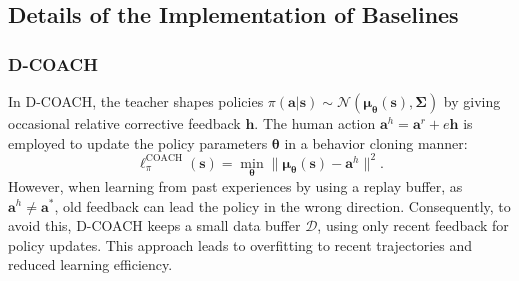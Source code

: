 
\subsection{Details of the Implementation of Baselines}
\label{appendix:baselines}
\subsubsection{D-COACH}
In \mbox{D-COACH}, the teacher shapes policies $\pi(\bm a|\bm s) \!\sim \! \mathcal{N} (\bm \mu_{\bm \theta}(\bm s), \bm \Sigma)$ by giving occasional relative corrective feedback $\bm h$. 
The human action $\bm a^{h} = \bm a^r  + e  \bm h$ is employed to update the policy parameters $\bm \theta$ in a behavior cloning manner:
\begin{equation}
    \ell^{\text{COACH}}_{\pi}(\bm s) = \min_{\bm \theta}{ \| \bm \mu_{\bm \theta}(\bm s) - \bm a^{h} \|^2}.
    \label{eq:dcoach}
\end{equation}
However, when learning from past experiences by using a replay buffer, as $\bm a^{h} \neq \bm a^*$, old feedback can lead the policy in the wrong direction. 
Consequently, to avoid this, \mbox{D-COACH} keeps a small data buffer $\mathcal{D}$, using only recent feedback for policy updates.
This approach leads to overfitting to recent trajectories and reduced learning efficiency.

